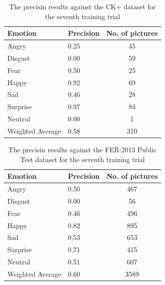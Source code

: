 \documentclass[runningheads,a4paper,11pt]{report}
\begin{document}
\begin{table}[htbp]
	\caption{The precisin results against the CK+ dataset for the seventh training trial}
	\label{fer_training_28k_001_squared_hinge_loss_ckp}
		\begin{center}
			\begin{tabular}{p{110pt}p{110pt}c}
				\textbf{Emotion}& \textbf{Precision}& \textbf{No. of pictures} \\
				\hline\hline
				Angry& 0.25& 45 \\
				Disgust& 0.00& 59 \\
				Fear& 0.50& 25 \\
				Happy& 0.92& 69 \\
				Sad& 0.46& 28 \\
				Surprise& 0.97& 83 \\
				Neutral& 0.00& 1 \\
				\hline
				Weighted Average& 0.58& 310
			\end{tabular}
		\end{center}
\end{table}
\begin{table}[htbp]
	\caption{The precisin results against the FER-2013 Public Test dataset for the seventh training trial}
	\label{fer_training_28k_001_squared_hinge_loss_public_test}
		\begin{center}
			\begin{tabular}{p{110pt}p{110pt}c}
				\textbf{Emotion}& \textbf{Precision}& \textbf{No. of pictures} \\
				\hline\hline
				Angry& 0.50& 467 \\
				Disgust& 0.00& 56 \\
				Fear& 0.46& 496 \\
				Happy& 0.82& 895 \\
				Sad& 0.53& 653 \\
				Surprise& 0.71& 415 \\
				Neutral& 0.51& 607 \\
				\hline
				Weighted Average& 0.60 &3589
			\end{tabular}
		\end{center}
\end{table}
\end{document}
